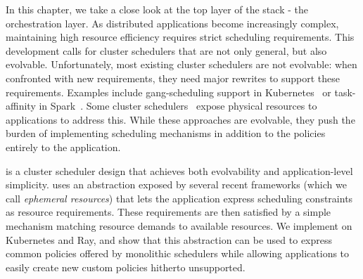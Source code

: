 In this chapter, we take a close look at the top layer of the stack - the orchestration layer. As distributed applications become increasingly complex, maintaining high resource efficiency requires strict scheduling requirements. This development calls for cluster schedulers that are not only general, but also evolvable. Unfortunately, most existing cluster schedulers are not evolvable: when confronted with new requirements, they need major rewrites to support these requirements. Examples include gang-scheduling support in Kubernetes~\cite{spark-ganscheduling, kubernetes} or task-affinity in Spark~\cite{spark-ganscheduling}. Some cluster schedulers~\cite{omega,mesos} expose physical resources to applications to address this. While these approaches are evolvable, they push the burden of implementing scheduling mechanisms in addition to the policies entirely to the application.

\name{} is a cluster scheduler design that achieves both evolvability and application-level simplicity. \name{} uses an abstraction exposed by several recent frameworks (which we call \textit{ephemeral resources}) that lets the application express scheduling constraints as resource requirements. These requirements are then satisfied by a simple mechanism matching resource demands to available resources. We implement \name{} on Kubernetes and Ray, and show that this abstraction can be used to express common policies offered by monolithic schedulers while allowing applications to easily create new custom policies hitherto unsupported.